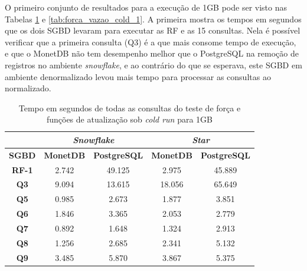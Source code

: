 O primeiro conjunto de resultados para a execução de 1GB pode ser visto nas Tabelas \ref{tab:queries_cold_1} e \ref{tab:forca_vazao_cold_1}. A primeira mostra os tempos em segundos que os dois SGBD levaram para executar as RF e as 15 consultas. Nela é possível verificar que a primeira consulta (Q3) é a que mais consome tempo de execução, e que o MonetDB não tem desempenho melhor que o PostgreSQL na remoção de registros no ambiente \textit{snowflake}, e ao contrário do que se esperava, este SGBD em ambiente denormalizado levou mais tempo para processar as consultas ao normalizado. 

\begin{table}[htpb]
        \centering
        \caption{Tempo em segundos de todas as consultas do teste de força e funções de atualização sob \textit{cold run} para 1GB}
        \label{tab:queries_cold_1}
        \begin{tabular}{|c|c|c|c|c|} 
        \cline{2-5}
        \multicolumn{1}{c|}{} & \multicolumn{2}{c|}{\textit{\textbf{Snowflake}} } & \multicolumn{2}{c|}{\textit{\textbf{Star}} }  \\ 
        \hline
         \textbf{SGBD}        & \textbf{MonetDB}  & \textbf{PostgreSQL}           & \textbf{MonetDB}  & \textbf{PostgreSQL}       \\ 
        \hline
         \textbf{RF-1}        & 2.742             & 49.125                        & 2.975             & 45.889                    \\ 
        \hline
         \textbf{Q3}          & 9.094             & 13.615                        & 18.056            & 65.649                    \\ 
        \hline
         \textbf{Q5}          & 0.985             & 2.673                         & 1.877             & 3.851                     \\ 
        \hline
         \textbf{Q6}          & 1.846             & 3.365                         & 2.053             & 2.779                     \\ 
        \hline
         \textbf{Q7}          & 0.892             & 1.648                         & 1.324             & 2.913                     \\ 
        \hline
         \textbf{Q8}          & 1.256             & 2.685                         & 2.341             & 5.132                     \\ 
        \hline
         \textbf{Q9}          & 3.485             & 5.870                         & 3.867             & 5.375                     \\ 

\end{tabular}
\end{table}

